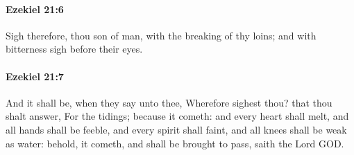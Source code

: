 		\paragraph{Ezekiel 21:6} %
			\label{EZEKIEL-21-6}

			Sigh therefore, thou son of man, with the breaking of thy loins; and with bitterness sigh before their eyes.


		\paragraph{Ezekiel 21:7} %
			\label{EZEKIEL-21-7}

			And it shall be, when they say unto thee, Wherefore sighest thou? that thou shalt answer, For the tidings; because it cometh: and every heart shall melt, and all hands shall be feeble, and every spirit shall faint, and all knees shall be weak as water: behold, it cometh, and shall be brought to pass, saith the Lord GOD.

